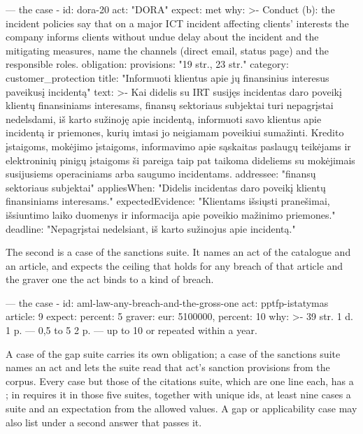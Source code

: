 \begin{codefile}{ --- the case }
  - id: dora-20
    act: "DORA"
    expect: met
    why: >-
      Conduct (b): the incident policies say that on a major ICT incident
      affecting clients' interests the company informs clients without undue
      delay about the incident and the mitigating measures, name the channels
      (direct email, status page) and the responsible roles.
    obligation:
      provisions: "19 str., 23 str."
      category: customer_protection
      title: "Informuoti klientus apie jų finansinius interesus paveikusį incidentą"
      text: >-
        Kai didelis su IRT susijęs incidentas daro poveikį klientų
        finansiniams interesams, finansų sektoriaus subjektai turi nepagrįstai
        nedelsdami, iš karto sužinoję apie incidentą, informuoti savo klientus
        apie incidentą ir priemones, kurių imtasi jo neigiamam poveikiui
        sumažinti. Kredito įstaigoms, mokėjimo įstaigoms, informavimo apie
        sąskaitas paslaugų teikėjams ir elektroninių pinigų įstaigoms ši
        pareiga taip pat taikoma dideliems su mokėjimais susijusiems
        operaciniams arba saugumo incidentams.
      addressee: "finansų sektoriaus subjektai"
      appliesWhen: "Didelis incidentas daro poveikį klientų finansiniams interesams."
      expectedEvidence: "Klientams išsiųsti pranešimai, išsiuntimo laiko duomenys ir informacija apie poveikio mažinimo priemones."
      deadline: "Nepagrįstai nedelsiant, iš karto sužinojus apie incidentą."
\end{codefile}

The second is a case of the sanctions suite. It names an act of the catalogue and an article,
and expects the ceiling that holds for any breach of that article and the graver one the act
binds to a kind of breach.

\begin{codefile}{ --- the case }
  - id: aml-law-any-breach-and-the-gross-one
    act: pptfp-istatymas
    article: 9
    expect: {percent: 5}
    graver: {eur: 5100000, percent: 10}
    why: >-
      39 str. 1 d. 1 p. — 0,5 to 5 %
      2 p. — up to 10 %
      or repeated within a year.
\end{codefile}

A case of the gap suite carries its own obligation; a case of the sanctions suite names an
act and lets the suite read that act's sanction provisions from the corpus. Every case but
those of the citations suite, which are one line each, has a ;
 in  requires it in those
five suites, together with unique ids, at least nine cases a suite and an expectation from the
allowed values. A gap or applicability case may also list under  a second answer
that passes it.

